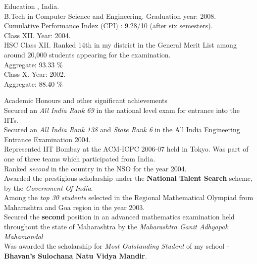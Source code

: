 \documentclass[final]{resume}
\author{Sangram R. Raje}
\def\iitb{Indian Institute of Technology Bombay}
\begin{document}
\maketitle


\begin{category}{Education}
\citem{\iitb}, India.\\
B.Tech in Computer Science and Engineering. Graduation year: 2008.\\
Cumulative Performance Index (CPI) : 9.28/10 (after six semesters).
\\
Class XII. Year: 2004.\\
HSC Class XII. Ranked 14th in my district in the General Merit List among around 20,000 students appearing for the examination.\\
Aggregate: 93.33 \%
\\
Class X. Year: 2002.\\
Aggregate: 88.40 \%
\end{category}
\vspace{1pt}



\begin{category}{Academic Honours and other significant achievements}
\\
Secured an \emph{All India Rank 69} in the national level exam for entrance into the IITs.
\\
Secured an \emph{All India Rank 138} and \emph{State Rank 6} in the All India Engineering Entrance Examination 2004.
\\
Represented IIT Bombay at the ACM-ICPC 2006-07 held in Tokyo. Was part of one of three teams which participated from India.
\\
Ranked \emph{second} in the country in the NSO for the year 2004.
\\
Awarded the prestigious scholarship under the \textbf{National Talent Search} scheme, by the \emph{Government Of India}.
\\
Among the \emph{top 30 students} selected in the Regional Mathematical Olympiad from Maharashtra and Goa region in the year 2003.
\\
Secured the \textbf{second} position in an advanced mathematics examination held throughout the state of Maharashtra by the \emph{Maharashtra Ganit Adhyapak Mahamandal}
\\
Was awarded the scholarship for \emph{Most Outstanding Student} of my school - \textbf{Bhavan's Sulochana Natu Vidya Mandir}.
\end{category}
\vspace{1pt}
\end{document}
